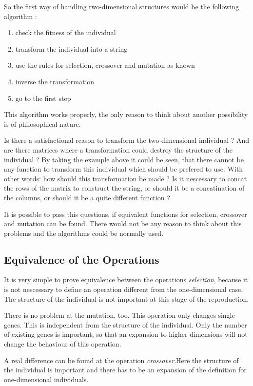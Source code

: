 So the first way of handling two-dimensional structures would be the following
algorithm :
\begin{enumerate}
  \item check the fitness of the individual
  \item transform the individual into a string
  \item use the rules for selection, crossover and mutation as known
  \item inverse the transformation
  \item go to the first step
\end{enumerate}
This algorithm works properly, the only reason to think about another possibility
is of philosophical nature.

Is there a satisfactional reason to transform the two-dimensional individual ?
And are there matrices where a transformation could destroy the structure of
the individual ? By taking the example above it could be seen, that there cannot
be any function to transform this individual which should be prefered to use.
With other words: how should this transformation be made ? Is it nescessary to
concat the rows of the matrix to construct the string, or should it be a concatination
of the columns, or should it be a quite different function ?

It is possible to pass this questions, if equivalent functions for selection,
crossover and mutation can be found. There would not be any reason to think
about this problems and the algorithms could be normally used.

\subsection{Equivalence of the Operations}
It is very simple to prove equivalence between the operations {\it selection},
because it is not nescessary to define an operation different from the one-dimensional
case. The structure of the individual is not important at this stage of the
reproduction.

There is no problem at the mutation, too. This operation only changes single
genes. This is independent from the structure of the individual. Only the number
of existing genes is important, so that an expansion to higher dimensions will
not change the behaviour of this operation.

A real difference can be found at the operation {\it crossover}.Here the structure
of the individual is important and there has to be an expansion of the definition
for one-dimensional individuals.

